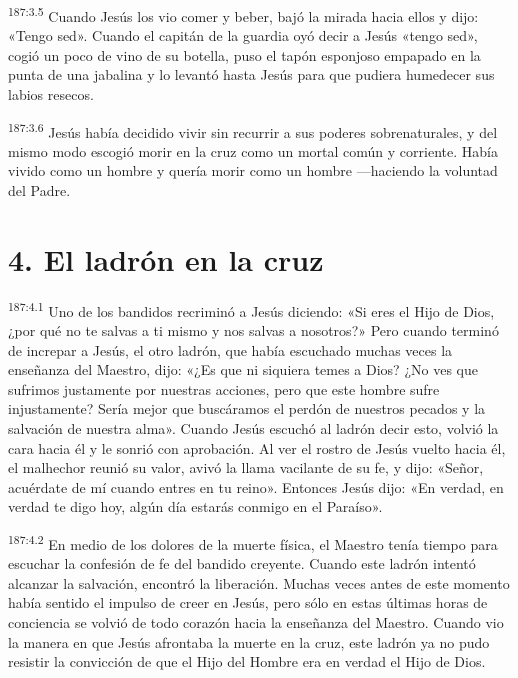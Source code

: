 \par 
\textsuperscript{187:3.5} Cuando Jesús los vio comer y beber, bajó la mirada hacia ellos y dijo: «Tengo sed». Cuando el capitán de la guardia oyó decir a Jesús «tengo sed», cogió un poco de vino de su botella, puso el tapón esponjoso empapado en la punta de una jabalina y lo levantó hasta Jesús para que pudiera humedecer sus labios resecos.

\par 
\textsuperscript{187:3.6} Jesús había decidido vivir sin recurrir a sus poderes sobrenaturales, y del mismo modo escogió morir en la cruz como un mortal común y corriente. Había vivido como un hombre y quería morir como un hombre ---haciendo la voluntad del Padre.

\section*{4. El ladrón en la cruz}
\par 
\textsuperscript{187:4.1} Uno de los bandidos recriminó a Jesús diciendo: «Si eres el Hijo de Dios, ¿por qué no te salvas a ti mismo y nos salvas a nosotros?» Pero cuando terminó de increpar a Jesús, el otro ladrón, que había escuchado muchas veces la enseñanza del Maestro, dijo: «¿Es que ni siquiera temes a Dios? ¿No ves que sufrimos justamente por nuestras acciones, pero que este hombre sufre injustamente? Sería mejor que buscáramos el perdón de nuestros pecados y la salvación de nuestra alma». Cuando Jesús escuchó al ladrón decir esto, volvió la cara hacia él y le sonrió con aprobación. Al ver el rostro de Jesús vuelto hacia él, el malhechor reunió su valor, avivó la llama vacilante de su fe, y dijo: «Señor, acuérdate de mí cuando entres en tu reino». Entonces Jesús dijo: «En verdad, en verdad te digo hoy, algún día estarás conmigo en el Paraíso».

\par 
\textsuperscript{187:4.2} En medio de los dolores de la muerte física, el Maestro tenía tiempo para escuchar la confesión de fe del bandido creyente. Cuando este ladrón intentó alcanzar la salvación, encontró la liberación. Muchas veces antes de este momento había sentido el impulso de creer en Jesús, pero sólo en estas últimas horas de conciencia se volvió de todo corazón hacia la enseñanza del Maestro. Cuando vio la manera en que Jesús afrontaba la muerte en la cruz, este ladrón ya no pudo resistir la convicción de que el Hijo del Hombre era en verdad el Hijo de Dios.

